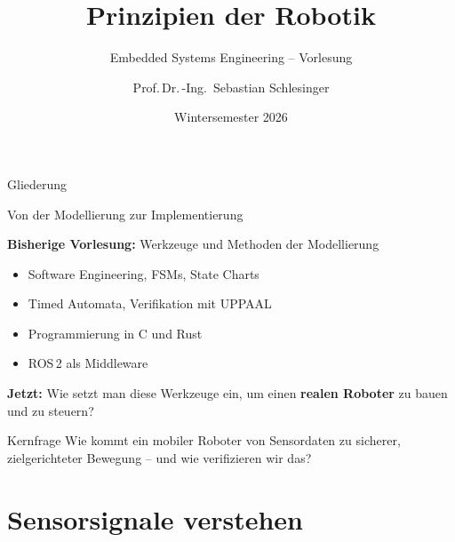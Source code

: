 \documentclass[%
  aspectratio=169,
  10pt
]{beamer}
\title[Prinzipien der Robotik]{Prinzipien der Robotik}
\subtitle{Embedded Systems Engineering -- Vorlesung}
\author[Schlesinger]{Prof.\,Dr.\,-Ing.\ Sebastian Schlesinger}
\institute{%
  Fachbereich 2 -- Duales Studium Wirtschaft \& Technik\\
  HWR Berlin}
\date{Wintersemester 2026}
\newcommand{\hl}[1]{{\color{fbblau}\textbf{#1}}}
\begin{document}

\begin{frame}[plain]
  \titlepage
\end{frame}

\begin{frame}{Gliederung}
  \tableofcontents
\end{frame}


\begin{frame}{Von der Modellierung zur Implementierung}

\textbf{Bisherige Vorlesung:} Werkzeuge und Methoden der Modellierung
\begin{itemize}
  \item Software Engineering, FSMs, State Charts
  \item Timed Automata, Verifikation mit UPPAAL
  \item Programmierung in C und Rust
  \item ROS\,2 als Middleware
\end{itemize}

\pause
\vspace{3mm}
\textbf{Jetzt:} Wie setzt man diese Werkzeuge ein, um einen
\hl{realen Roboter} zu bauen und zu steuern?

\pause
\vspace{3mm}
\begin{alertblock}{Kernfrage}
  Wie kommt ein mobiler Roboter von Sensordaten zu sicherer,
  zielgerichteter Bewegung -- und wie verifizieren wir das?
\end{alertblock}
\end{frame}


\section{Sensorsignale verstehen}
\end{document}
